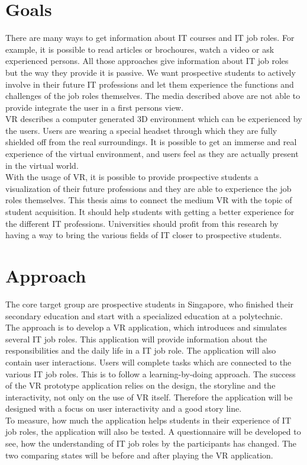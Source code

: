 \section{Goals}
There are many ways to get information about IT courses and IT job roles. For example, it is possible to read articles or brochoures, watch a video or ask experienced persons. All those approaches give information about IT job roles but the way they  provide it is passive. We want prospective students to actively involve in their future IT professions and let them experience the functions and challenges of the job roles themselves. The media described above are not able to provide integrate the user in a first persons view. \\
 VR describes a computer generated 3D environment which can be experienced by the users. Users are wearing a special headset through which they are fully shielded off from the real surroundings. It is possible to get an immerse and real experience of the virtual environment, and users feel as they are actually present in the virtual world. \cite{Linowes.2015}\\
With the usage of VR, it is possible to provide prospective students a visualization of their future professions and they are able to experience the job roles themselves. This thesis aims to connect the medium VR with the topic of student acquisition. It should help students with getting a better experience for the different IT professions. Universities should profit from this research by having a way to bring the various fields of IT closer to prospective students.

\section{Approach}
The core target group are prospective students in Singapore, who finished their secondary education and start with a specialized education at a polytechnic.\\
The approach is to develop a VR application, which introduces and simulates several IT job roles. This application will provide information about the responsibilities and the daily life in a IT job role. The application will also contain user interactions. Users will complete tasks which are connected to the various IT job roles. This is to follow a learning-by-doing approach. The success of the VR prototype application relies on the design, the storyline and the interactivity, not only on the use of VR itself. Therefore the application will be designed with a focus on user interactivity and a good story line.\\
To measure, how much the application helps students in their experience of IT job roles, the application will also be tested. A questionnaire will be developed to see, how the understanding of IT job roles by the participants has changed. The two comparing states will be before and after playing the VR application.

